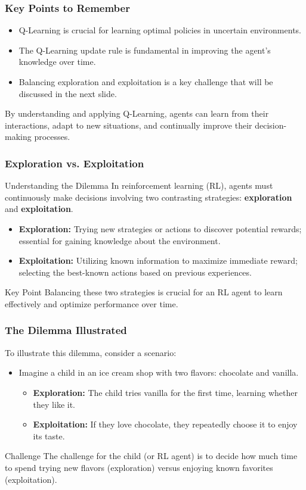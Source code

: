 \documentclass[aspectratio=169]{beamer}
\begin{document}
\begin{frame}[fragile]
    \frametitle{Key Points to Remember}
    \begin{itemize}
        \item Q-Learning is crucial for learning optimal policies in uncertain environments.
        \item The Q-Learning update rule is fundamental in improving the agent's knowledge over time.
        \item Balancing exploration and exploitation is a key challenge that will be discussed in the next slide.
    \end{itemize}
    By understanding and applying Q-Learning, agents can learn from their interactions, adapt to new situations, and continually improve their decision-making processes.
\end{frame}

\begin{frame}[fragile]
  \frametitle{Exploration vs. Exploitation}
  \begin{block}{Understanding the Dilemma}
    In reinforcement learning (RL), agents must continuously make decisions involving two contrasting strategies: \textbf{exploration} and \textbf{exploitation}.
  \end{block}
  \begin{itemize}
    \item \textbf{Exploration:} Trying new strategies or actions to discover potential rewards; essential for gaining knowledge about the environment.
    \item \textbf{Exploitation:} Utilizing known information to maximize immediate reward; selecting the best-known actions based on previous experiences.
  \end{itemize}
  \begin{block}{Key Point}
    Balancing these two strategies is crucial for an RL agent to learn effectively and optimize performance over time.
  \end{block}
\end{frame}

\begin{frame}[fragile]
  \frametitle{The Dilemma Illustrated}
  To illustrate this dilemma, consider a scenario:
  \begin{itemize}
    \item Imagine a child in an ice cream shop with two flavors: chocolate and vanilla.
      \begin{itemize}
        \item \textbf{Exploration:} The child tries vanilla for the first time, learning whether they like it.
        \item \textbf{Exploitation:} If they love chocolate, they repeatedly choose it to enjoy its taste.
      \end{itemize}
  \end{itemize}
  \begin{block}{Challenge}
    The challenge for the child (or RL agent) is to decide how much time to spend trying new flavors (exploration) versus enjoying known favorites (exploitation).
  \end{block}
\end{frame}
\end{document}
